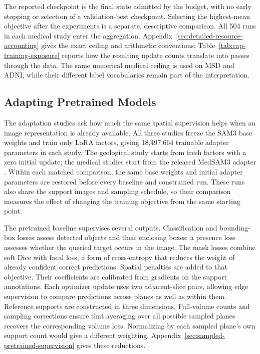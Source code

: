 \documentclass[12pt,a4paper]{article}
\begin{document}
The reported checkpoint is the final state admitted by the budget, with
no early stopping or selection of a validation-best checkpoint. Selecting
the highest-mean objective after the experiments is a separate, descriptive
comparison. All 504 runs in each medical study enter the aggregation.
Appendix~\ref{sec:detailed-resource-accounting} gives the exact ceiling
and arithmetic conventions; Table~\ref{tab:cap-training-exposure} reports
how the resulting update counts translate into passes through the data.
The same numerical medical ceiling is used on MSD and ADNI, while their
different label vocabularies remain part of the interpretation.

\subsection{Adapting Pretrained Models}

The adaptation studies ask how much the same spatial supervision helps
when an image representation is already available. All three studies
freeze the SAM3 base weights and train only LoRA factors, giving
18,497,664 trainable adapter parameters in each study. The geological
study starts from fresh factors with a zero initial update; the medical
studies start from the released MedSAM3 adapter
\cite{carion2025sam3,liu2025medsam3}. Within each matched comparison, the
same base weights and initial adapter parameters are restored before
every baseline and constrained run. These runs also share the support
images and sampling schedule, so their comparison measures the effect
of changing the training objective from the same starting point.

The pretrained baseline supervises several outputs. Classification and
bounding-box losses assess detected objects and their enclosing boxes; a
presence loss assesses whether the queried target occurs in the image. The
mask losses combine soft Dice with focal loss, a form of cross-entropy that
reduces the weight of already confident correct predictions. Spatial
penalties are added to that objective. Their coefficients are calibrated
from gradients on the support annotations. Each optimizer update uses two
adjacent-slice pairs, allowing edge supervision to compare predictions
across planes as well as within them. Reference supports are constructed in
three dimensions. Full-volume counts and sampling corrections ensure that
averaging over all possible sampled planes recovers the corresponding volume
loss. Normalizing by each sampled plane's own support count would give a
different weighting. Appendix~\ref{sec:sampled-pretrained-supervision} gives
these reductions.
\end{document}

